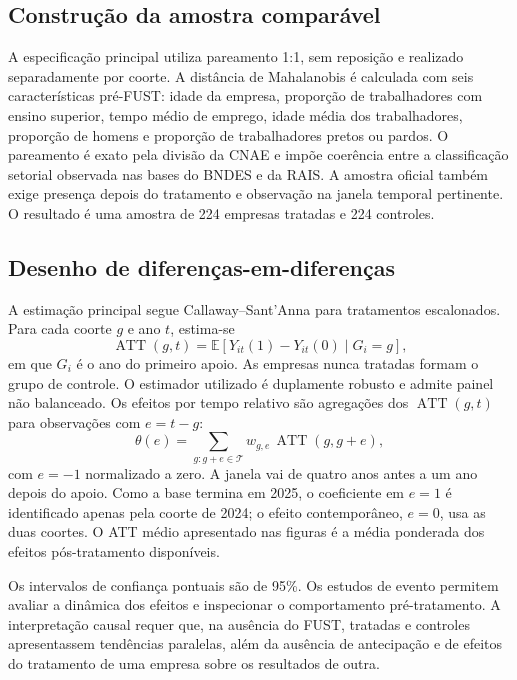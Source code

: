 \documentclass[12pt,a4paper]{article}
\newcommand{\ATT}{\operatorname{ATT}}
\newcommand{\E}{\mathbb{E}}
\begin{document}
\subsection{Construção da amostra comparável}

A especificação principal utiliza pareamento 1:1, sem reposição e realizado separadamente por
coorte. A distância de Mahalanobis é calculada com seis características pré-FUST: idade da
empresa, proporção de trabalhadores com ensino superior, tempo médio de emprego, idade média dos
trabalhadores, proporção de homens e proporção de trabalhadores pretos ou pardos. O pareamento é
exato pela divisão da CNAE e impõe coerência entre a classificação setorial observada nas bases
do BNDES e da RAIS. A amostra oficial também exige presença depois do tratamento e observação na
janela temporal pertinente. O resultado é uma amostra de 224 empresas tratadas e 224 controles.

\subsection{Desenho de diferenças-em-diferenças}

A estimação principal segue Callaway--Sant'Anna para tratamentos escalonados. Para cada coorte
$g$ e ano $t$, estima-se
\begin{equation}
  \ATT(g,t)=\E\!\left[Y_{it}(1)-Y_{it}(0)\mid G_i=g\right],
\end{equation}
em que $G_i$ é o ano do primeiro apoio. As empresas nunca tratadas formam o grupo de controle. O
estimador utilizado é duplamente robusto e admite painel não balanceado. Os efeitos por tempo
relativo são agregações dos $\ATT(g,t)$ para observações com $e=t-g$:
\begin{equation}
  \theta(e)=\sum_{g:g+e\in\mathcal{T}} w_{g,e}\,\ATT(g,g+e),
\end{equation}
com $e=-1$ normalizado a zero. A janela vai de quatro anos antes a um ano depois do apoio. Como a
base termina em 2025, o coeficiente em $e=1$ é identificado apenas pela coorte de 2024; o efeito
contemporâneo, $e=0$, usa as duas coortes. O ATT médio apresentado nas figuras é a média ponderada
dos efeitos pós-tratamento disponíveis.

Os intervalos de confiança pontuais são de 95\%. Os estudos de evento permitem avaliar a
dinâmica dos efeitos e inspecionar o comportamento pré-tratamento. A interpretação causal requer
que, na ausência do FUST, tratadas e controles apresentassem tendências paralelas, além da
ausência de antecipação e de efeitos do tratamento de uma empresa sobre os resultados de outra.
\end{document}
